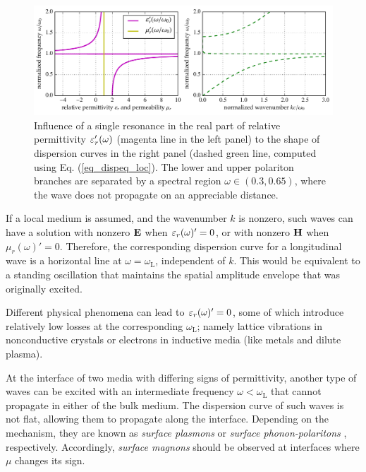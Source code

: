 \begin{figure}[t] \caption{Influence of a single resonance in the real part of relative permittivity $\varepsilon_r'(\omega)$ (magenta line in the left panel) to the shape of dispersion curves in the right panel (dashed green line, computed using Eq. (\ref{eq_dispeq_loc}). The lower and upper polariton branches are separated by a spectral region $\omega \in (0.3, 0.65)$, where the wave does not propagate on an appreciable distance.} \label{fg_dcsimpleel} \centering 
	\includegraphics[width=\textwidth]{img/dispersion_landau_lifshitz/dispersion_simple_el.pdf}
\end{figure}
If a local medium is assumed, and the wavenumber $k$ is nonzero, such waves can have a solution with nonzero $\mathbf{E}$ when $\varepsilon_r(\omega)' = 0$, or with nonzero $\mathbf{H}$ when $\mu_r(\omega)' = 0$. Therefore, the corresponding dispersion curve for a longitudinal wave is a horizontal line at $\omega = \omega_{\text{L}}$, independent of $k$. This would be equivalent to a standing oscillation that maintains the spatial amplitude envelope that was originally excited. 

Different physical phenomena can lead to $\varepsilon_r(\omega)' = 0$, some of which introduce relatively low losses at the corresponding $\omega_{\text{L}}$; namely lattice vibrations in nonconductive crystals or electrons in inductive media (like metals and dilute plasma). 

At the interface of two media with differing signs of permittivity, another type of waves can be excited with an intermediate frequency $\omega < \omega_{\text{L}}$ that cannot propagate in either of the bulk medium. The dispersion curve of such waves is not flat, allowing them to propagate along the interface. Depending on the mechanism, they are known as  \textit{surface plasmons} or \textit{surface phonon-polaritons} \cite[p. 87]{klingshirn2007semiconductor}, respectively. Accordingly, \textit{surface magnons} should be observed at interfaces where $\mu$ changes its sign.
